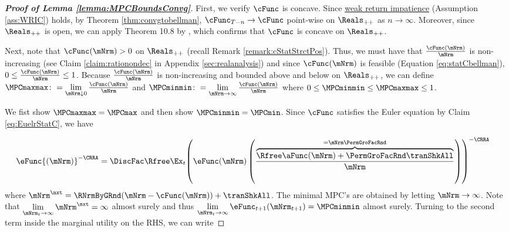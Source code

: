 \documentclass[\econtexRoot/BufferStockTheory]{subfiles}
\begin{document}
\begin{proof}[\textbf{Proof of Lemma \ref{lemma:MPCBoundsConvg}}]

First, we verify $\cFunc$ is concave.
Since \hyperlink{WRIC}{weak return impatience} (Assumption \ref{ass:WRIC}) holds, by Theorem \ref{thm:convgtobellman}, $\cFunc_{T-n}\rightarrow \cFunc$ point-wise on $\Reals_{++}$ as $n\rightarrow \infty$.
Moreover, since $\Reals_{++}$ is open, we can apply Theorem 10.8 by \cite{Rockafellar1972}, which confirms that $\cFunc$ is concave on $\Reals_{++}$.

Next, note that $\cFunc(\mNrm)>0$ on $\Reals_{++}$ (recall Remark \ref{remark:cStatStrctPos}).
Thus, we must have that $\frac{\cFunc(\mNrm)}{\mNrm}$ is non-increasing (see Claim \ref{claim:rationondec} in Appendix \ref{sec:realanalysis}) and since  $\cFunc(\mNrm)$ is feasible (Equation \ref{eq:statCbellman}), $0 \leq \frac{\cFunc(\mNrm)}{\mNrm}\leq 1$.
Because $\frac{\cFunc(\mNrm)}{\mNrm}$ is non-increasing and bounded above and below on $\Reals_{++}$, we can define $\MPCmaxmax\colon = \lim\limits_{\mNrm\downarrow 0}\frac{\cFunc(\mNrm)}{\mNrm}$ and $\MPCminmin \colon= \lim\limits_{\mNrm\rightarrow \infty}\frac{\cFunc(\mNrm)}{\mNrm}$ where $0 \leq \MPCminmin \leq \MPCmaxmax\leq 1$.


We fist show $\MPCmaxmax = \MPCmax$ and then show $\MPCminmin = \MPCmin$.
Since $\cFunc$ satisfies the Euler equation by Claim \ref{eq:EuelrStatC}, we have

\begin{equation}\begin{gathered}\begin{aligned}\label{eq:eFuncEulerStat}
 \eFunc{(\mNrm)}^{-\CRRA}  & = \DiscFac \Rfree \Ex_{t}{\left(\eFunc({\mNrm})\left(\frac{\overbrace{\Rfree \aFunc(\mNrm)+{\PermGroFacRnd}{\tranShkAll}}^{={\mNrm} \PermGroFacRnd}}{\mNrm}\right)\right)}^{-\CRRA }
\end{aligned}\end{gathered}\end{equation}
%
where ${\mNrm}^{\nxt} = \RNrmByGRnd(\mNrm -\cFunc(\mNrm)) +\tranShkAll$.
The minimal MPC's are obtained by letting $\mNrm \rightarrow \infty$.
Note that $\lim\limits_{\mNrm_{t}\rightarrow \infty} \mNrm^{\nxt} = \infty$ almost surely and thus $\lim\limits_{\mNrm_{t}\rightarrow \infty}\eFunc_{t+1}({\mNrm}_{t+1}) = \MPCminmin$ almost surely.
Turning to the second term inside the marginal utility on the RHS, we can write


\end{proof}
\end{document}
